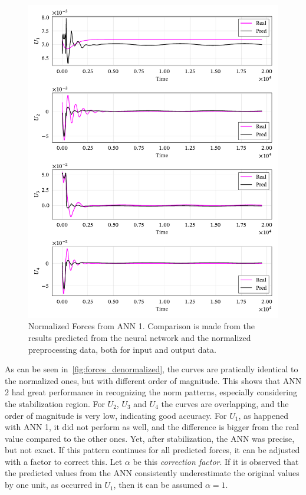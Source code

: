 \begin{figure}[!htb]
    \centering
    \caption[Normalized Forces from ANN 1]{Normalized Forces from ANN 1. Comparison is made from the results predicted from the neural network and the normalized preprocessing data, both for input and output data.}
    \includegraphics{figures/4results/uav/forces_normalized.pdf}

    \label{fig:forces_normalized}
\end{figure}

As can be seen in~\cref{fig:forces_denormalized}, the curves are pratically identical to the normalized ones, but with different order of magnitude.
This shows that ANN 2 had great performance in recognizing the norm patterns, especially considering the stabilization region.
For \(U_2\), \(U_3\) and \(U_4\) the curves are overlapping, and the order of magnitude is very low, indicating good accuracy.
For \(U_1\), as happened with ANN 1, it did not perform as well, and the difference is bigger from the real value compared to the other ones. Yet, after stabilization, the ANN was precise, but not exact. 
If this pattern continues for all predicted forces, it can be adjusted with a factor to correct this.
Let \(\alpha\) be this \emph{correction factor}. 
If it is observed that the predicted values from the ANN consistently underestimate the original values by one unit, as occurred in \(U_1\), then it can be assumed \(\alpha = 1\).

